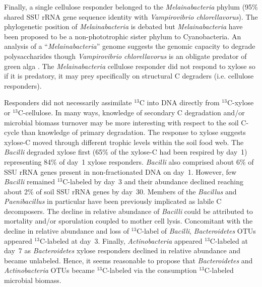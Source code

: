 Finally, a single cellulose responder belonged to the \textit{Melainabacteria}
phylum (95\% shared SSU rRNA gene sequence identity with \textit{Vampirovibrio
chlorellavorus}). The phylogenetic position of \textit{Melainabacteria} is
debated but \textit{Melainabacteria} have been proposed to be
a non-phototrophic sister phylum to Cyanobacteria. An analysis of
a ``\textit{Melainabacteria}'' genome \citep{Di_Rienzi_2013} suggests the
genomic capacity to degrade polysaccharides though \textit{Vampirovibrio
chlorellavorus} is an obligate predator of green alga \citep{gromov_1972}. The
\textit{Melainabacteria} cellulose responder did not respond to xylose so if it
is predatory, it may prey specifically on structural C degraders (i.e.
cellulose responders).

Responders did not necessarily assimilate $^{13}$C into DNA directly
from $^{13}$C-xylose or $^{13}$C-cellulose. In many ways, knowledge of
secondary C degradation and/or microbial biomass turnover may be more
interesting with respect to the soil C-cycle than knowledge of primary
degradation. The response to xylose suggests xylose-C moved through different
trophic levels within the soil food web. The \textit{Bacilli} degraded xylose
first (65\% of the xylose-C had been respired by day~1) representing 84\% of
day~1 xylose responders. \textit{Bacilli} also comprised about 6\% of SSU rRNA
genes present in non-fractionated DNA on day~1. However, few \textit{Bacilli}
remained $^{13}$C-labeled by day~3 and their abundance declined reaching about
2\% of soil SSU rRNA genes by day~30. Members of the \textit{Bacillus}
\citep{Cleveland2007} and \textit{Paenibacillus} in particular
\citep{Verastegui_2014} have been previously implicated as labile
C decomposers. The decline in relative abundance of \textit{Bacilli} could be
attributed to mortality and/or sporulation coupled to mother cell lysis.
Concomitant with the decline in relative abundance and loss of $^{13}$C-label
of \textit{Bacilli}, \textit{Bacteroidetes} OTUs appeared $^{13}$C-labeled at
day~3. Finally, \textit{Actinobacteria} appeared $^{13}$C-labeled at day~7 as
\textit{Bacteroidetes} xylose responders declined in relative abundance and
became unlabeled. Hence, it seems reasonable to propose that
\textit{Bacteroidetes} and \textit{Actinobacteria} OTUs became $^{13}$C-labeled
via the consumption $^{13}$C-labeled microbial biomass. 

